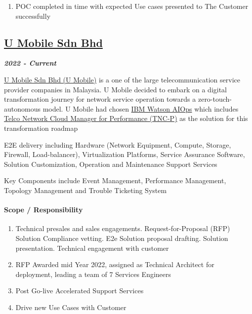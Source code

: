 \documentclass[
]{article}
\providecommand{\tightlist}{%
  \setlength{\itemsep}{0pt}\setlength{\parskip}{0pt}}
\begin{document}
\begin{enumerate}
\def\labelenumi{\arabic{enumi}.}
\tightlist
\item
  POC completed in time with expected Use cases presented to The
  Customer successfully
\end{enumerate}

\hypertarget{u-mobile-sdn-bhd}{%
\subsection{\texorpdfstring{\href{https://www.u.com.my/}{U Mobile Sdn
Bhd}}{U Mobile Sdn Bhd}}\label{u-mobile-sdn-bhd}}

\textbf{\emph{2022 - Current}}

\href{https://www.u.com.my/}{U Mobile Sdn Bhd (U Mobile)} is a one of
the large telecommunication service provider companies in Malaysia. U
Mobile decided to embark on a digital transformation journey for network
service operation towards a zero-touch-autonomous model. U Mobile had
chosen \href{https://www.ibm.com/watson/aiops-overview/}{IBM Watson
AIOps} which includes
\href{https://www.ibm.com/docs/en/tncm-p/1.4.2}{Telco Network Cloud
Manager for Performance (TNC-P)} as the solution for this transformation
roadmap

E2E delivery including Hardware (Network Equipment, Compute, Storage,
Firewall, Load-balancer), Virtualization Platforms, Service Assurance
Software, Solution Customization, Operation and Maintenance Support
Services

Key Components include Event Management, Performance Management,
Topology Management and Trouble Ticketing System

\hypertarget{scope-responsibility-1}{%
\paragraph{Scope / Responsibility}\label{scope-responsibility-1}}

\begin{enumerate}
\def\labelenumi{\arabic{enumi}.}
\tightlist
\item
  Technical presales and sales engagements. Request-for-Proposal (RFP)
  Solution Compliance vetting. E2e Solution proposal drafting. Solution
  presentation. Technical engagement with customer
\item
  RFP Awarded mid Year 2022, assigned as Technical Architect for
  deployment, leading a team of 7 Services Engineers
\item
  Post Go-live Accelerated Support Services
\item
  Drive new Use Cases with Customer
\end{enumerate}
\end{document}
